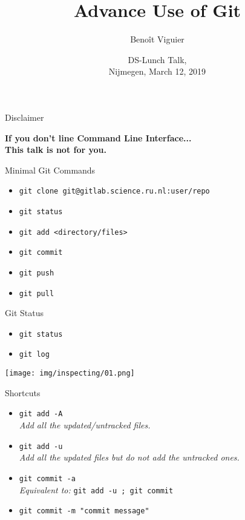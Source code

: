 \documentclass[usenames,dvipsnames,handout,9pt]{beamer}
\title{Advance Use of Git}
\author[Viguier]
{Beno\^{i}t Viguier}
\date[Short Occasion]{\vspace{0.5cm}DS-Lunch Talk,\\Nijmegen, March 12, 2019}
\begin{document}

\begin{frame}
  \titlepage
\end{frame}


\begin{frame}{Disclaimer}
\begin{center}
  \alert{\Large{\textbf{If you don't line Command Line Interface...\\This talk is not for you.}}}
\end{center}
\end{frame}

\begin{frame}{Minimal Git Commands}
  \begin{itemize}
    \item \lstinline|git clone git@gitlab.science.ru.nl:user/repo|
    \item \lstinline|git status|
    \item \lstinline|git add <directory/files>|
    \item \lstinline|git commit|
    \item \lstinline|git push|
    \item \lstinline|git pull|
  \end{itemize}
\end{frame}



%
%
\begin{frame}{Git Status}
\begin{itemize}
  \item \lstinline|git status|
  \item \lstinline|git log|
\end{itemize}

\texttt{[image: img/inspecting/01.png]}
\end{frame}


\begin{frame}{Shortcuts}
\begin{itemize}
  \item \lstinline|git add -A|\\
  \emph{Add all the updated/untracked files.}
  \item \lstinline|git add -u|\\
  \emph{Add all the updated files but do not add the untracked ones.}
  \item \lstinline|git commit -a|\\
  \emph{Equivalent to:} \lstinline|git add -u ; git commit|
  \item \lstinline|git commit -m "commit message"|
\end{itemize}
\end{frame}
\end{document}
